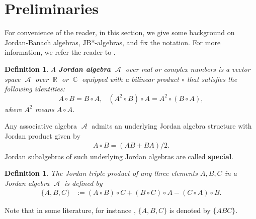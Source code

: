 \documentclass{article}
\theoremstyle{plain} %
\newtheorem{defn}[thm]{Definition}
\numberwithin{equation}{section}
\DeclareMathOperator{\Cdb}{{\mathbb C}}
\DeclareMathOperator{\Rdb}{{\mathbb R}}
\DeclareMathOperator{\Al}{{\mathcal A}}
\begin{document}
\section{Preliminaries}\label{section:preliminaries}
For convenience of the reader, in this section, we give some background on Jordan-Banach algebras, JB*-algebras, and fix the notation. For more information, we refer the reader to \cite{alfsen:2003:geometry,cabrera:rodriguez:2014:non, hanche:1984:jordan}.

\begin{defn}\label{defn:ja}
	A {\bf Jordan algebra} $\Al$ over real or complex numbers is a vector space $\Al$ over $\Rdb$ or $\Cdb$ equipped with a  bilinear product $\circ$ that satisfies the following identities:
	\[A\circ B =B\circ A, \,\ \,\ (A^2\circ B)\circ A=A^2\circ (B\circ A),\]
where $\displaystyle A^2$ means $\displaystyle A\circ A.$ 
\end{defn}
Any associative algebra $\Al$ admits an underlying Jordan algebra structure with Jordan product given by 
\begin{align}\label{notion:specialJ}
 A\circ B=(AB+BA)/2.   
\end{align}	
	Jordan subalgebras of such underlying Jordan algebras are called {\bf special}. 
\begin{defn}\label{defn:triple}
	The Jordan triple product of any three elements $A, B, C$ in  a Jordan algebra $\Al$ is defined by 
	\begin{align}\label{notion:triple}
	\{A, B, C\}&:=(A\circ B)\circ C+(B\circ C)\circ A-(C\circ A)\circ B.
			\end{align}
\end{defn}
Note that in some literature, for instance \cite{alfsen:2003:geometry, hanche:1984:jordan}, $\displaystyle \{A, B, C\}$ is denoted by $\{ABC\}.$
\end{document}
